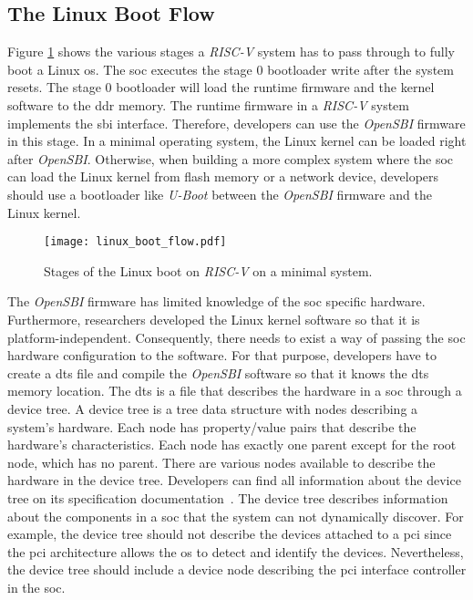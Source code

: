 \subsection{The Linux Boot Flow}
\label{subsection:linux_boot_flow}
Figure \ref{fig:linux_boot_flow} shows the various stages a \textit{RISC-V} system has to pass through to fully boot a Linux \acrlong{os}. The \acrshort{soc} executes the stage 0 bootloader write after the system resets. The stage 0 bootloader will load the runtime firmware and the kernel software to the \acrfull{ddr} memory. The runtime firmware in a \textit{RISC-V} system implements the \acrshort{sbi} interface. Therefore, developers can use the \textit{OpenSBI} firmware in this stage. In a minimal operating system, the Linux kernel can be loaded right after \textit{OpenSBI}. Otherwise, when building a more complex system where the \acrshort{soc} can load the Linux kernel from flash memory or a network device, developers should use a bootloader like \textit{U-Boot} between the \textit{OpenSBI} firmware and the Linux kernel.

\begin{figure}[!ht]
    \centering
    \texttt{[image: linux\_boot\_flow.pdf]}
    \caption{Stages of the Linux boot on \textit{RISC-V} on a minimal system.}
    \label{fig:linux_boot_flow}
\end{figure}

The \textit{OpenSBI} firmware has limited knowledge of the \acrshort{soc} specific hardware. Furthermore, researchers developed the Linux kernel software so that it is platform-independent. Consequently, there needs to exist a way of passing the \acrshort{soc} hardware configuration to the software. For that purpose, developers have to create a \acrfull{dts} file and compile the \textit{OpenSBI} software so that it knows the \acrshort{dts} memory location. The \acrlong{dts} is a file that describes the hardware in a \acrshort{soc} through a device tree. A device tree is a tree data structure with nodes describing a system's hardware. Each node has property/value pairs that describe the hardware's characteristics. Each node has exactly one parent except for the root node, which has no parent. There are various nodes available to describe the hardware in the device tree. Developers can find all information about the device tree on its specification documentation~\cite{devicetree_spec}. The device tree describes information about the components in a \acrshort{soc} that the system can not dynamically discover. For example, the device tree should not describe the devices attached to a \acrfull{pci} since the \acrshort{pci} architecture allows the \acrshort{os} to detect and identify the devices. Nevertheless, the device tree should include a device node describing the \acrshort{pci} interface controller in the \acrshort{soc}.

